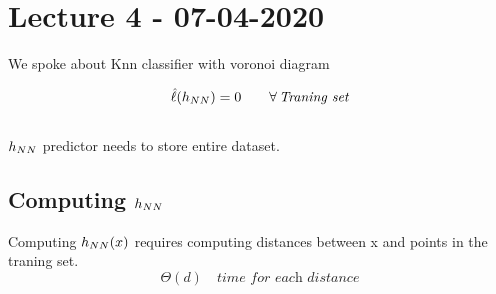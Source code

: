 \documentclass[../main.tex]{subfiles}
\begin{document}
\chapter{Lecture 4 - 07-04-2020}

We spoke about Knn classifier with voronoi diagram

$$
\hat{\ell}(h_{NN}) = 0 \qquad \forall \, \textit{Traning set}
$$
\\
$h_{NN}$ predictor needs to store entire dataset.
\\
\section{Computing $h_{NN}$}
Computing $h_{NN}(x)$ requires computing distances between x and points in the traning set.
\\
$$
\Theta(d) \quad \textit{time for each distance}
$$
\end{document}
